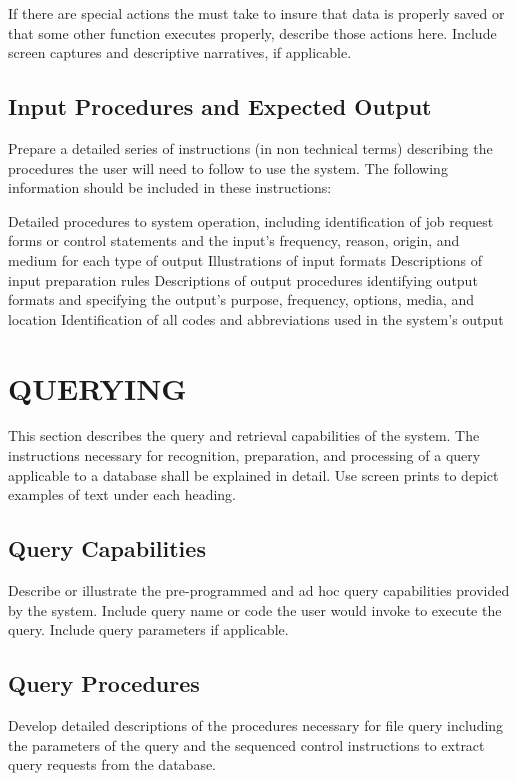 \documentclass[10pt,letterpaper,extrafontsizes]{memoir}
\begin{document}
If there are special actions the  must take to insure that data is properly saved or that some other function executes properly, describe those actions here.  Include screen captures and descriptive narratives, if applicable.
\section{Input Procedures and Expected Output}

Prepare a detailed series of instructions (in non technical terms) describing the procedures the user will need to follow to use the system.  The following information should be included in these instructions:

Detailed procedures to  system operation, including identification of job request forms or control statements and the input's frequency, reason, origin, and medium for each type of output
Illustrations of input formats
Descriptions of input preparation rules
Descriptions of output procedures identifying output formats and specifying the output's purpose, frequency, options, media, and location
Identification of all codes and abbreviations used in the system's output

\chapter{QUERYING}

This section describes the query and retrieval capabilities of the system.  The instructions necessary for recognition, preparation, and processing of a query applicable to a database shall be explained in detail. Use screen prints to depict examples of text under each heading.
\section{Query Capabilities}

Describe or illustrate the pre-programmed and ad hoc query capabilities provided by the system.  Include query name or code the user would invoke to execute the query.  Include query parameters if applicable.
\section{Query Procedures}

Develop detailed descriptions of the procedures necessary for file query including the parameters of the query and the sequenced control instructions to extract query requests from the database.
\end{document}

